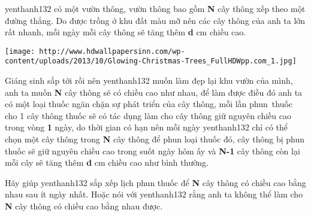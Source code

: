 yenthanh132 có một vườn thông, vườn thông bao gồm \textbf{ N } cây thông xếp theo một đường thẳng. Do được trồng ở khu đất màu mỡ nên các cây thông của anh ta lớn rất nhanh, mỗi ngày mỗi cây thông sẽ tăng thêm \textbf{ d } cm chiều cao.


\texttt{[image: http://www.hdwallpapersinn.com/wp-content/uploads/2013/10/Glowing-Christmas-Trees\_FullHDWpp.com\_1.jpg]}

Giáng sinh sắp tới rồi nên yenthanh132 muốn làm đẹp lại khu vườn của mình, anh ta muốn \textbf{ N } cây thông sẽ có chiều cao như nhau, để làm được điều đó anh ta có một loại thuốc ngăn chặn sự phát triển của cây thông, mỗi lần phun thuốc cho 1 cây thông thuốc sẽ có tác dụng làm cho cây thông giữ nguyên chiều cao trong vòng \textbf{ 1 } ngày, do thời gian có hạn nên mỗi ngày yenthanh132 chỉ có thể chọn một cây thông trong \textbf{ N } cây thông để phun loại thuốc đó, cây thông bị phun thuốc sẽ giữ nguyên chiều cao trong suốt ngày hôm ấy và \textbf{ N-1 } cây thông còn lại mỗi cây sẽ tăng thêm \textbf{ d } cm chiều cao như bình thường.

Hãy giúp yenthanh132 sắp xếp lịch phun thuốc để \textbf{ N } cây thông có chiều cao bằng nhau sau ít ngày nhất. Hoặc nói với yenthanh132 rằng anh ta không thể làm cho \textbf{ N } cây thông có chiều cao bằng nhau được.